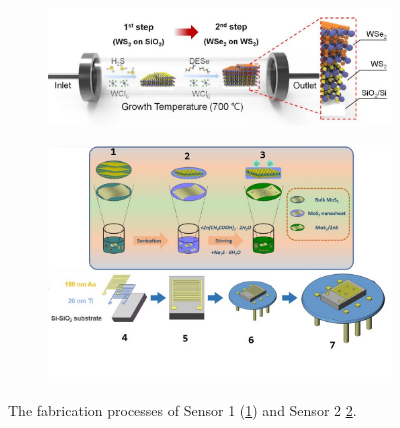 \begin{figure}
\centering
\begin{subfigure}{\textwidth}
    \includegraphics[width=\textwidth]{04_2d_tmd_heterojunction_gas_sensors//fig/sensor1_fabrication.jpg}
    \caption{}
    \label{fig:fabrication_sensor1}
\end{subfigure}
\begin{subfigure}{\textwidth}
    \includegraphics[width=\textwidth]{04_2d_tmd_heterojunction_gas_sensors//fig/sensor2_fabrication.jpg}
    \caption{}
    \label{fig:fabrication_sensor2}
\end{subfigure}
\caption{The fabrication processes of Sensor 1 (\cref{fig:fabrication_sensor1}) and Sensor 2 \cref{fig:fabrication_sensor2}.}
\label{fig:fabrication}
\end{figure}
